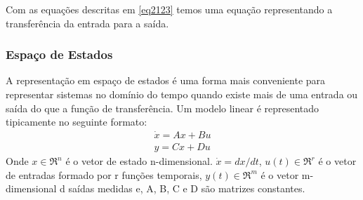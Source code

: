 Com as equações descritas em \ref{eq2123} temos uma equação representando a transferência da entrada para a saída.
\subsubsection{Espaço de Estados}
A representação em espaço de estados é uma forma mais conveniente para representar sistemas no domínio do tempo quando existe mais de uma entrada ou saída do que a função de transferência. Um modelo linear é representado tipicamente no seguinte formato:
\begin{equation}
\begin{array}{c}
\dot{x}=Ax+Bu\\
y=Cx+Du
\end{array}
\end{equation}
Onde $x \in \Re^n$ é o vetor de estado n-dimensional. $\dot{x}=dx/dt$, $u(t) \in \Re^r$ é o vetor de entradas formado por r funções temporais, $y(t) \in \Re^m$ é o vetor m-dimensional d saídas medidas e, A, B, C e D são matrizes constantes.


